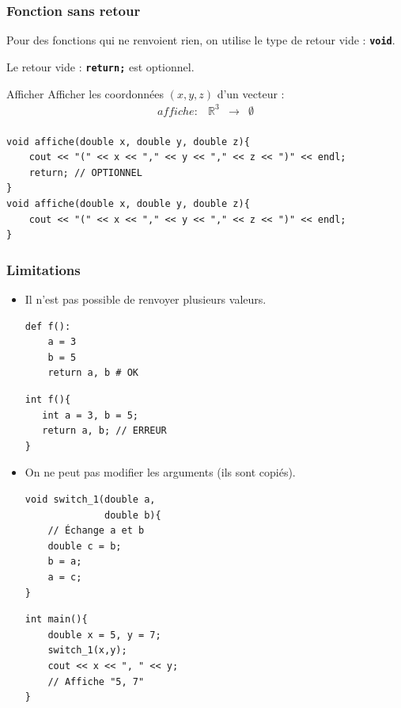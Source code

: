 \begin{frame}[fragile]
	\frametitle{Fonction sans retour}
	Pour des fonctions qui ne renvoient rien, on utilise le type de retour vide : \texttt{\textbf{void}}.

	Le retour vide : \texttt{\textbf{return;}} est optionnel.

	\begin{block}{Afficher}
	Afficher les coordonnées $(x,y,z)$ d'un vecteur :
		$$
		\begin{array}{cccc}
		affiche: & \mathbb{R}^3 & \to & \emptyset \\
		\end{array}
		$$
	\end{block}

	\begin{verbatim}
void affiche(double x, double y, double z){
    cout << "(" << x << "," << y << "," << z << ")" << endl;
    return; // OPTIONNEL
}
void affiche(double x, double y, double z){
    cout << "(" << x << "," << y << "," << z << ")" << endl;
}
	\end{verbatim}
\end{frame}

\begin{frame}[fragile]
	\frametitle{Limitations}
	\begin{itemize}
	\item Il n'est pas possible de renvoyer plusieurs valeurs.
	\begin{minipage}{0.46\linewidth}
		\begin{verbatim}
def f():
    a = 3
    b = 5
    return a, b # OK
		\end{verbatim}
	\end{minipage}
	\hfill
	\begin{minipage}{0.47\linewidth}
		\begin{verbatim}
int f(){
   int a = 3, b = 5;
   return a, b; // ERREUR
}
		\end{verbatim}
	\end{minipage}
	\item On ne peut pas modifier les arguments (ils sont copiés).
	\begin{minipage}{0.46\linewidth}
			\begin{verbatim}
void switch_1(double a,
              double b){
    // Échange a et b
    double c = b;
    b = a;
    a = c;
}
			\end{verbatim}
		\end{minipage}
		\hfill
		\begin{minipage}{0.51\linewidth}
			\begin{verbatim}
int main(){
    double x = 5, y = 7;
    switch_1(x,y);
    cout << x << ", " << y;
    // Affiche "5, 7"
}
			\end{verbatim}
		\end{minipage}
	\end{itemize}
\end{frame}

